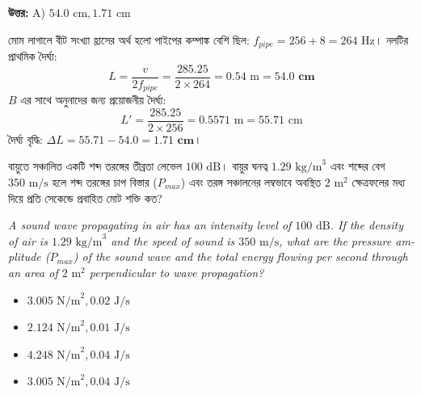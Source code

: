\documentclass[12pt, a4paper]{article}
\begin{document}
\vspace{0.5em}
\begin{tcolorbox}[answerbox]
    \textbf{\color{success} উত্তর:} A) $54.0\text{ cm}, 1.71\text{ cm}$
\end{tcolorbox}
\vspace{1em}

\begin{tcolorbox}[solutionbox={সমাধান (Solution)}]
    \noindent
    মোম লাগালে বীট সংখ্যা হ্রাসের অর্থ হলো পাইপের কম্পাঙ্ক বেশি ছিল: $f_{pipe} = 256 + 8 = 264\text{ Hz}$। নলটির প্রাথমিক দৈর্ঘ্য:
    \[ L = \frac{v}{2f_{pipe}} = \frac{285.25}{2 \times 264} = 0.54\text{ m} = \mathbf{54.0\text{ cm}} \]
    $B$ এর সাথে অনুনাদের জন্য প্রয়োজনীয় দৈর্ঘ্য:
    \[ L' = \frac{285.25}{2 \times 256} = 0.5571\text{ m} = 55.71\text{ cm} \]
    দৈর্ঘ্য বৃদ্ধি: $\Delta L = 55.71 - 54.0 = \mathbf{1.71\text{ cm}}$।
\end{tcolorbox}

\vspace{2em}

\begin{tcolorbox}[questionbox={প্রশ্ন (Question) 24}]
    \noindent
    বায়ুতে সঞ্চালিত একটি শব্দ তরঙ্গের তীব্রতা লেভেল $100\text{ dB}$। বায়ুর ঘনত্ব $1.29\text{ kg/m}^3$ এবং শব্দের বেগ $350\text{ m/s}$ হলে শব্দ তরঙ্গের চাপ বিস্তার ($P_{max}$) এবং তরঙ্গ সঞ্চালনের লম্বভাবে অবস্থিত $2\text{ m}^2$ ক্ষেত্রফলের মধ্য দিয়ে প্রতি সেকেন্ডে প্রবাহিত মোট শক্তি কত?
    
    \vspace{0.8em}
    \begin{english}
    \noindent\textit{\color{darkgray}
    A sound wave propagating in air has an intensity level of $100\text{ dB}$. If the density of air is $1.29\text{ kg/m}^3$ and the speed of sound is $350\text{ m/s}$, what are the pressure amplitude ($P_{max}$) of the sound wave and the total energy flowing per second through an area of $2\text{ m}^2$ perpendicular to wave propagation?
    }
    \end{english}
\end{tcolorbox}

\begin{itemize}[label={}, leftmargin=1cm, itemsep=0.5em]
    \item[\textbf{A)}] $3.005\text{ N/m}^2, 0.02\text{ J/s}$
    \item[\textbf{B)}] $2.124\text{ N/m}^2, 0.01\text{ J/s}$
    \item[\textbf{C)}] $4.248\text{ N/m}^2, 0.04\text{ J/s}$
    \item[\textbf{D)}] $3.005\text{ N/m}^2, 0.04\text{ J/s}$
\end{itemize}
\end{document}
